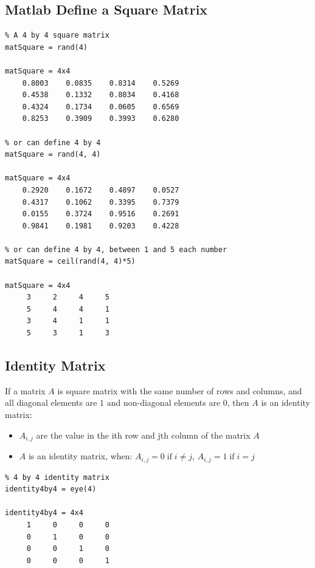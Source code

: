 \documentclass[
]{book}
\begin{document}
\hypertarget{matlab-define-a-square-matrix}{%
\subsection{Matlab Define a Square Matrix}\label{matlab-define-a-square-matrix}}

\begin{verbatim}
% A 4 by 4 square matrix
matSquare = rand(4)

matSquare = 4x4    
    0.8003    0.0835    0.8314    0.5269
    0.4538    0.1332    0.8034    0.4168
    0.4324    0.1734    0.0605    0.6569
    0.8253    0.3909    0.3993    0.6280

% or can define 4 by 4
matSquare = rand(4, 4)

matSquare = 4x4    
    0.2920    0.1672    0.4897    0.0527
    0.4317    0.1062    0.3395    0.7379
    0.0155    0.3724    0.9516    0.2691
    0.9841    0.1981    0.9203    0.4228

% or can define 4 by 4, between 1 and 5 each number
matSquare = ceil(rand(4, 4)*5)

matSquare = 4x4    
     3     2     4     5
     5     4     4     1
     3     4     1     1
     5     3     1     3
\end{verbatim}

\hypertarget{identity-matrix}{%
\subsection{Identity Matrix}\label{identity-matrix}}

If a matrix \(A\) is square matrix with the same number of rows and
columns, and all diagonal elements are \(1\) and non-diagonal elements are
\(0\), then \(A\) is an identity matrix:

\begin{itemize}
\item
  \(A_{i,j}\) are the value in the ith row and jth column of the matrix
  \(A\)
\item
  \(A\) is an identity matrix, when:
  \(A_{i,j} =0\;\textrm{if}\;i\not= j\), \(A_{i,j} =1\;\textrm{if}\;i=j\)
\end{itemize}

\begin{verbatim}
% 4 by 4 identity matrix
identity4by4 = eye(4)

identity4by4 = 4x4    
     1     0     0     0
     0     1     0     0
     0     0     1     0
     0     0     0     1
\end{verbatim}
\end{document}

